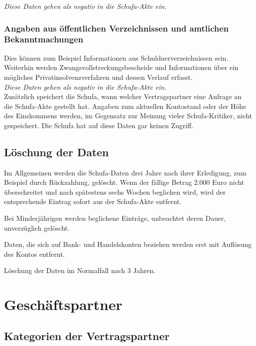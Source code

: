 \documentclass[12pt]{article}
\begin{document}
\textit{Diese Daten gehen als negativ in die Schufa-Akte ein.}



\subsubsection*{Angaben aus öffentlichen Verzeichnissen und amtlichen Bekanntmachungen}
Dies können zum Beispiel Informationen aus Schuldnerverzeichnissen sein. Weiterhin werden Zwangsvollstreckungsbescheide und Informationen über ein mögliches Privatinsolvenzverfahren und dessen Verlauf erfasst.\\

\textit{Diese Daten gehen als negativ in die Schufa-Akte ein.}\\

Zusätzlich speichert die Schufa, wann welcher Vertragspartner eine Anfrage an die Schufa-Akte gestellt hat. Angaben zum aktuellen Kontostand oder der Höhe des Einskommens werden, im Gegensatz zur Meinung 
vieler Schufa-Kritiker, nicht gespeichert. Die Schufa hat auf diese Daten gar keinen Zugriff.





\subsection{Löschung der Daten}
Im Allgemeinen werden die Schufa-Daten drei Jahre nach ihrer Erledigung, zum Beispiel durch Rückzahlung, gelöscht. Wenn der fällige Betrag 2.000 Euro nicht überschreitet und nach spätestens sechs Wochen 
beglichen wird, wird der entsprechende Eintrag sofort aus der Schufa-Akte entfernt.

Bei Minderjährigen werden beglichene Einträge, unbeachtet deren Dauer, unverzüglich gelöscht.

Daten, die sich auf Bank- und Handelskonten beziehen werden erst mit Auflösung des Kontos entfernt.



Löschung der Daten im Normalfall nach 3 Jahren.






\section{Geschäftspartner}

\subsection{Kategorien der Vertragspartner}
\end{document}

